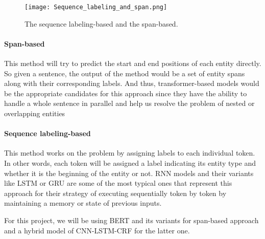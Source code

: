 \documentclass[conference]{IEEEtran}
\begin{document}
\begin{figure}[h]
    \centering
    \texttt{[image: Sequence\_labeling\_and\_span.png]}
    \caption{The sequence labeling-based and the span-based\cite{ji2022winwin}.}
    \label{fig5}
\end{figure}

\paragraph{Span-based} This method will try to predict the start and end positions of
each entity directly. So given a sentence, the output of the method would be a set of
entity spans along with their corresponding labels. And thus, transformer-based models
would be the appropriate candidates for this approach since they have the ability to
handle a whole sentence in parallel and help us resolve the problem of nested or overlapping entities

\paragraph{Sequence labeling-based} This method works on the problem by assigning labels
to each individual token. In other words, each token will be assigned a label indicating
its entity type and whether it is the beginning of the entity or not. RNN models and their
variants like LSTM or GRU are some of the most typical ones that represent this approach
for their strategy of executing sequentially token by token by maintaining a memory or state
of previous inputs.

For this project, we will be using BERT and its variants for span-based approach and a
hybrid model of CNN-LSTM-CRF for the latter one.
\end{document}
